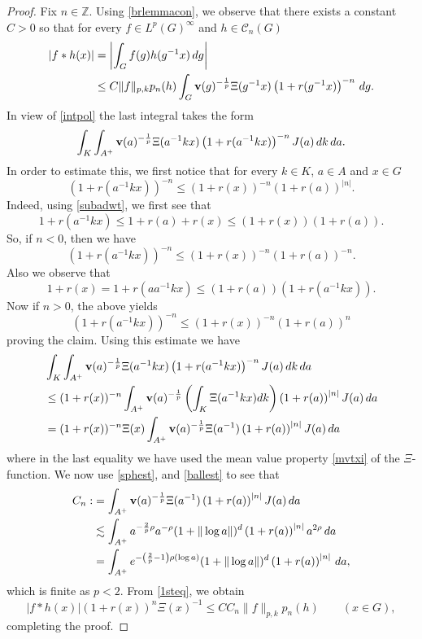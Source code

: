 \documentclass[12pt,letterpaper,titlepage,reqno]{amsart}
\theoremstyle{plain}
\theoremstyle{definition}
\numberwithin{equation}{section}
\begin{document}
\begin{proof}
Fix $n \in \mathbb{Z}$. Using \eqref{brlemmacon}, we observe that there exists a constant $C>0$ so that for every $f\in L^{p}(G)^{\infty}$ and $h\in \mathcal{C}_{n}(G)$
\begin{align}\label{1steq}
	\nonumber
    |f\ast h(x)|&=\left|\int_G f(g)h(g^{-1}x)\,dg\right|\\
	&\leq C\|f\|_{p,k}p_n(h)\int_{G} {\bf{v}}(g)^{-\frac1p}\Xi(g^{-1}x)\left(1+r(g^{-1}x)\right)^{-n}\,dg.
\end{align}
In view of \eqref{intpol} the last integral takes the form
\begin{align*}
	\int_{K}\int_{A^+}{\bf{v}}(a)^{-\frac1p}\Xi(a^{-1}kx)\left(1+r(a^{-1}kx)\right)^{-n} J(a)\,dk\,da.
\end{align*}
In order to estimate this, we first notice that for every $k\in K$, $a\in A$ and $x\in G$
$$
\left(1+r(a^{-1}kx)\right)^{-n}\leq (1+r(x))^{-n}(1+r(a))^{|n|}.
$$
Indeed, using \eqref{subadwt}, we first see that
$$
1+r(a^{-1}kx)
\leq 1+r(a)+r(x)\leq (1+r(x))(1+r(a)).
$$
So, if $n<0$, then we have
$$
(1+r(a^{-1}kx))^{-n}
\leq (1+r(x))^{-n}(1+r(a))^{-n}.
$$
Also we observe that
$$
1+r(x)
=1+r(aa^{-1}kx)
\leq (1+r(a))(1+r(a^{-1}kx)).
$$
Now if $n>0$, the above  yields
$$
(1+r(a^{-1}kx))^{-n}
\leq {(1+r(x))^{-n}}{(1+r(a))^{n}}
$$
proving the claim. Using this estimate we have
\begin{align*}
	&\int_{K}\int_{A^+}{\bf{v}}(a)^{-\frac1p}\Xi(a^{-1}kx)\left(1+r(a^{-1}kx)\right)^{-n} J(a)\,dk\,da\\
    &\leq (1+r(x))^{-n} \int_{A^+}{\bf{v}}(a)^{-\frac1p}\left(\int_{K}\Xi(a^{-1}kx)dk\right)\left(1+r(a)\right)^{|n|} J(a)\,da\\
	&=(1+r(x))^{-n}\Xi(x) \int_{A^+}{\bf{v}}(a)^{-\frac1p}\Xi(a^{-1})\left(1+r(a)\right)^{|n|} J(a)\,da
\end{align*}
where in the last equality we have used the mean value property
\eqref{mvtxi}  of the $\Xi$-function. We now use \eqref{sphest}, and \eqref{ballest} to see that
\begin{align*}
C_n:&=\int_{A^+}{\bf{v}}(a)^{-\frac1p}\Xi(a^{-1})\left(1+r(a)\right)^{|n|} J(a)\,da\\
&\lesssim \int_{A^+}a^{-\frac2p\rho}a^{-\rho}(1+\|\log a\|)^d\left(1+r(a)\right)^{|n|} a^{2\rho}\,da\\
&= \int_{A^+} e^{-\left(\frac2p-1\right)\rho(\log a)}(1+\|\log a\|)^d\left(1+r(a)\right)^{|n|}\,da,
\end{align*} which is finite as $p<2$. From \eqref{1steq}, we obtain
$$
|f\ast h(x)|(1+r(x))^{n}\Xi(x)^{-1}
\leq CC_n \|f\|_{p,k}p_n(h)\qquad (x\in G),
$$
completing the proof.
\end{proof}
\end{document}
